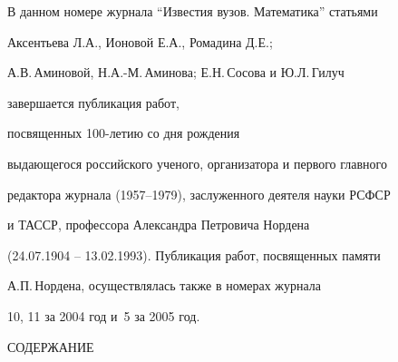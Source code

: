 




\newcommand{\tl}[3]{\medskip\noindent{\bf#1}\ #2 \dotfill #3 \par} 


\pagestyle{empty}







\par


\vskip 2cm


\par


\bigskip





В данном номере журнала ``Известия вузов. Математика'' статьями


Аксентьева Л.А., Ионовой Е.А., Ромадина Д.Е.;


А.В.\,Аминовой, Н.А.-М.\,Аминова; Е.Н.\,Сосова и Ю.Л.\,Гилуч


завершается публикация работ,


посвященных 100-летию со дня рождения


выдающегося российского ученого, организатора и первого главного


редактора журнала (1957--1979), заслуженного деятеля науки РСФСР


и ТАССР, профессора Александра Петровича Нордена


(24.07.1904 -- 13.02.1993). Публикация работ, посвященных памяти


А.П.\,Нордена, осуществлялась также в номерах журнала


10, 11 за 2004 год и \No\,5 за 2005 год.








\bigskip


\bigskip


\par


\centerline{\Large СОДЕРЖАНИЕ}


\bigskip


